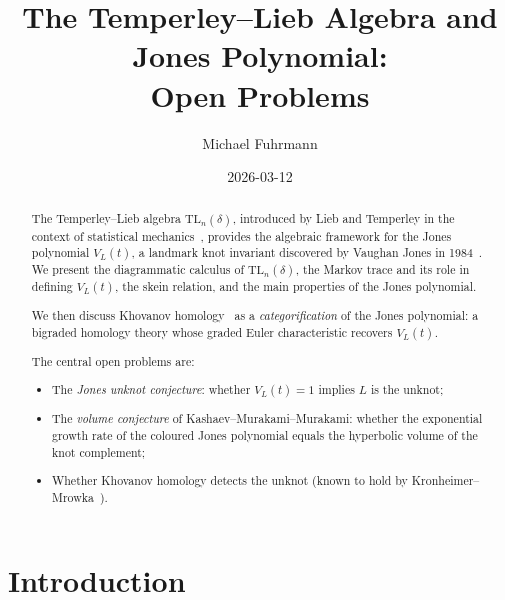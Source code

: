 \documentclass[12pt,a4paper]{amsart}
\theoremstyle{definition}
\theoremstyle{remark}
\begin{document}
\begin{abstract}
The Temperley--Lieb algebra $\mathrm{TL}_n(\delta)$, introduced by Lieb
and Temperley in the context of statistical mechanics~\cite{TemperleyLieb1971},
provides the algebraic framework for the Jones polynomial $V_L(t)$,
a landmark knot invariant discovered by Vaughan Jones in 1984~\cite{Jones1985}.
We present the diagrammatic calculus of $\mathrm{TL}_n(\delta)$,
the Markov trace and its role in defining $V_L(t)$, the skein relation,
and the main properties of the Jones polynomial.

We then discuss Khovanov homology~\cite{Khovanov2000} as a \emph{categorification}
of the Jones polynomial: a bigraded homology theory whose graded Euler
characteristic recovers $V_L(t)$.

The central open problems are:
\begin{itemize}
\item The \emph{Jones unknot conjecture}: whether $V_L(t) = 1$ implies
      $L$ is the unknot;
\item The \emph{volume conjecture} of Kashaev--Murakami--Murakami:
      whether the exponential growth rate of the coloured Jones polynomial
      equals the hyperbolic volume of the knot complement;
\item Whether Khovanov homology detects the unknot (known to hold by
      Kronheimer--Mrowka~\cite{KronheimerMrowka2011}).
\end{itemize}
\end{abstract}

\title{The Temperley--Lieb Algebra and Jones Polynomial:\\
Open Problems}
\author{Michael Fuhrmann}
\address{Specialist Mathematics Project, Build 165}
\date{2026-03-12}

\maketitle

\section{Introduction}
\end{document}
